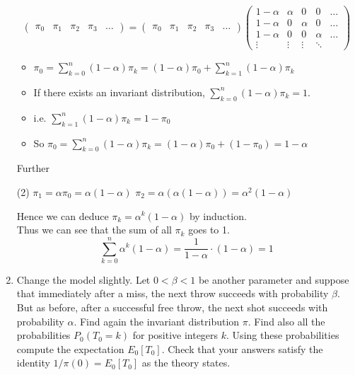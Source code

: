 \documentclass[12pt]{article}
\begin{document}
\begin{enumerate}[label=(\alph*)]
    $$
    \begin{pmatrix}
        \pi_0&\pi_1&\pi_2&\pi_3&\ldots
    \end{pmatrix}
    =
    \begin{pmatrix}
        \pi_0&\pi_1&\pi_2&\pi_3&\ldots
    \end{pmatrix}
    \begin{pmatrix}
        1-\alpha&\alpha&0&0&\ldots\\
        1-\alpha&0&\alpha&0&\ldots\\
        1-\alpha&0&0&\alpha&\ldots\\
        \vdots&\vdots&\vdots&\ddots
    \end{pmatrix}
    $$
    
    \begin{itemize}
        \item $\pi_0 = \sum_{k=0}^n  (1-\alpha)\pi_k
        = (1-\alpha)\pi_0 + \sum_{k=1}^n (1-\alpha)\pi_k  $
        
        \item If there exists an invariant distribution, $\sum_{k=0}^n  (1-\alpha)\pi_k = 1$.
        
        \item i.e. $\sum_{k=1}^n (1-\alpha)\pi_k = 1 - \pi_0$
        
        \item So $\pi_0 = \sum_{k=0}^n  (1-\alpha)\pi_k
        = (1-\alpha)\pi_0 + (1-\pi_0)
        = 1 - \alpha$
    \end{itemize}
    Further
    
    \begin{tasks}(2)
        \task $\pi_1 = \alpha\pi_0 = \alpha(1-\alpha)$
        \task $\pi_2 = \alpha(\alpha(1-\alpha))
        = \alpha^2 (1-\alpha)$
    \end{tasks}
    
    Hence we can deduce $\pi_k = \alpha^k (1-\alpha)$ by induction.\\
    
    Thus we can see that the sum of all $\pi_k$ goes to 1.
    $$
    \sum_{k=0}^n \alpha^k(1-\alpha) = \frac{1}{1-\alpha} \cdot (1-\alpha) = 1
    $$
    \newpage
    \item Change the model slightly. Let $0<\beta<1$ be another parameter and suppose that
    immediately after a miss, the next throw succeeds with probability $\beta$. But as before, after a successful free throw, the next shot succeeds with probability $\alpha$. Find again
    the invariant distribution $\pi$. Find also all the probabilities $P_0(T_0 = k)$ for positive integers $k$. Using these probabilities compute the expectation $E_0[T_0]$. Check that your answers satisfy the identity $1/\pi(0) = E_0[T_0]$ as the theory states.\\
    

\end{enumerate}
\end{document}
